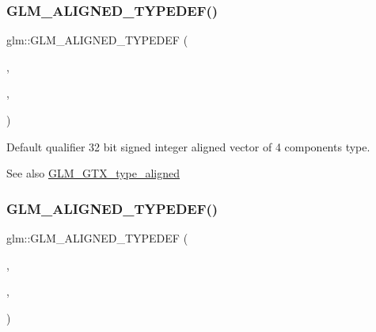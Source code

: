 \subsubsection{\texorpdfstring{G\+L\+M\+\_\+\+A\+L\+I\+G\+N\+E\+D\+\_\+\+T\+Y\+P\+E\+D\+E\+F()}{GLM\_ALIGNED\_TYPEDEF()}\hspace{0.1cm}{\footnotesize\ttfamily [64/209]}}
{\footnotesize\ttfamily glm\+::\+G\+L\+M\+\_\+\+A\+L\+I\+G\+N\+E\+D\+\_\+\+T\+Y\+P\+E\+D\+EF (\begin{DoxyParamCaption}\item[{\hyperlink{group__gtc__type__precision_ga78c16dde5527264e8085b375efba6f28}{i32vec4}}]{,  }\item[{aligned\+\_\+i32vec4}]{,  }\item[{16}]{ }\end{DoxyParamCaption})}

Default qualifier 32 bit signed integer aligned vector of 4 components type. \begin{DoxySeeAlso}{See also}
\hyperlink{group__gtx__type__aligned}{G\+L\+M\+\_\+\+G\+T\+X\+\_\+type\+\_\+aligned} 
\end{DoxySeeAlso}
\mbox{\label{group__gtx__type__aligned_ga965b1c9aa1800e93d4abc2eb2b5afcbf}} 
\subsubsection{\texorpdfstring{G\+L\+M\+\_\+\+A\+L\+I\+G\+N\+E\+D\+\_\+\+T\+Y\+P\+E\+D\+E\+F()}{GLM\_ALIGNED\_TYPEDEF()}\hspace{0.1cm}{\footnotesize\ttfamily [65/209]}}
{\footnotesize\ttfamily glm\+::\+G\+L\+M\+\_\+\+A\+L\+I\+G\+N\+E\+D\+\_\+\+T\+Y\+P\+E\+D\+EF (\begin{DoxyParamCaption}\item[{\hyperlink{group__gtc__type__precision_gad2bbfb4ed2d4b1e1551c721f81739e49}{i64vec1}}]{,  }\item[{aligned\+\_\+i64vec1}]{,  }\item[{8}]{ }\end{DoxyParamCaption})}

